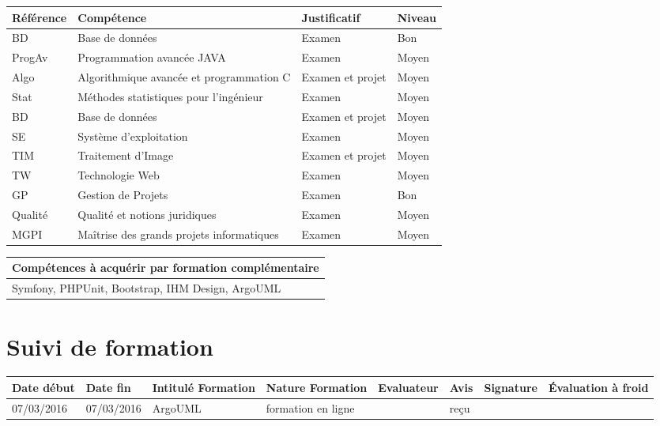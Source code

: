 \documentclass[11pt]{article}
\begin{document}
\centering
	\begin{longtable}{|p{3cm}|p{3cm}|p{3cm}|p{3cm}|}
	\hline
	\rowcolor{gray!40} Référence & Compétence & Justificatif & Niveau \\
	\hline
	 BD & Base de données & Examen & Bon \\
	 \hline
	 ProgAv & Programmation avancée JAVA & Examen & Moyen \\
	\hline
	Algo & Algorithmique avancée et programmation C & Examen et projet & Moyen \\
	\hline
	Stat & Méthodes statistiques pour l'ingénieur & Examen & Moyen \\
	\hline
	BD & Base de données & Examen et projet & Moyen \\
	\hline
	SE & Système d'exploitation & Examen & Moyen \\
	\hline
	TIM & Traitement d'Image & Examen et projet & Moyen \\
	\hline
	TW & Technologie Web & Examen & Moyen \\
	\hline
	GP & Gestion de Projets & Examen & Bon \\
    \hline
	Qualité & Qualité et notions juridiques & Examen & Moyen \\
	\hline
	MGPI & Maîtrise des grands projets informatiques & Examen & Moyen \\
	\hline
	\end{longtable}

\centering
	\begin{longtable}{|p{12cm}|}
	\hline
	\rowcolor{gray!40} Compétences à acquérir par formation complémentaire \\
	\hline
	Symfony, PHPUnit, Bootstrap, IHM Design, ArgoUML  \\
	\hline
	\end{longtable}

\section*{\large Suivi de formation}

\centering
	\begin{longtable}{|p{1.9cm}|p{1.9cm}|p{1.9cm}|p{1.9cm}|p{1cm}|p{1.5cm}|p{1.5cm}|p{1.5cm}|}
	\hline
	\rowcolor{gray!40} \tiny Date début & \tiny Date fin & \tiny Intitulé Formation & \tiny Nature Formation & \tiny Evaluateur & \tiny Avis & \tiny Signature & \tiny Évaluation à froid \\
	\hline
	07/03/2016 &07/03/2016 &ArgoUML &formation en ligne &\Julie &reçu & & \\
	\hline
	\end{longtable}
\end{document}
